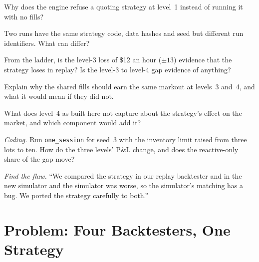 \begin{exercise}[$\star$]\label{exo:pl:backtest-engine-architecture:2}
Why does the engine refuse a quoting strategy at level~1 instead of running it with no fills?
\end{exercise}

\begin{exercise}[$\star$]\label{exo:pl:backtest-engine-architecture:3}
Two runs have the same strategy code, data hashes and seed but different run identifiers. What can differ?
\end{exercise}

\begin{exercise}[$\star\star$]\label{exo:pl:backtest-engine-architecture:4}
From the ladder, is the level-3 loss of \$12 an hour ($\pm 13$) evidence that the strategy loses in replay? Is the level-3 to level-4 gap
evidence of anything?
\end{exercise}

\begin{exercise}[$\star\star$]\label{exo:pl:backtest-engine-architecture:5}
Explain why the shared fills should earn the same markout at levels~3 and~4, and what it would mean if they did not.
\end{exercise}

\begin{exercise}[$\star\star$]\label{exo:pl:backtest-engine-architecture:6}
What does level~4 as built here not capture about the strategy's effect on the market, and which component would add it?
\end{exercise}

\begin{exercise}[$\star\star\star$]\label{exo:pl:backtest-engine-architecture:7}
\emph{Coding.} Run \texttt{one\_session} for seed~3 with the inventory limit raised from three lots to ten. How do the three levels'
P\&L change, and does the reactive-only share of the gap move?
\end{exercise}

\begin{exercise}[$\star\star\star$]\label{exo:pl:backtest-engine-architecture:8}
\emph{Find the flaw.} ``We compared the strategy in our replay backtester and in the new simulator and the simulator was worse, so the
simulator's matching has a bug. We ported the strategy carefully to both.''
\end{exercise}

\section{Problem: Four Backtesters, One Strategy}

